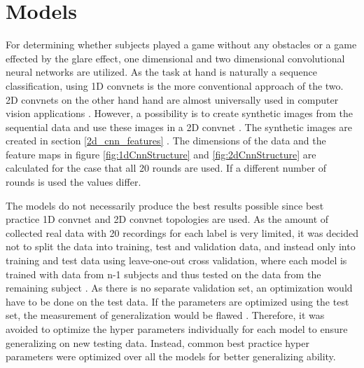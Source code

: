 \section{Models}
\label{models}
For determining whether subjects played a game without any obstacles or a game effected by the glare effect, one dimensional and two dimensional convolutional neural networks are utilized. As the task at hand is naturally a sequence classification, using 1D convnets is the more conventional approach of the two. 2D convnets on the other hand hand are almost universally used in computer vision applications \cite[Chapter~5]{cnn}. However, a possibility is to create synthetic images from the sequential data and use these images in a 2D convnet \cite{2dcnn}. The synthetic images are created in section \ref{2d_cnn_features} . The dimensions of the data and the feature maps in figure \ref{fig:1dCnnStructure} and \ref{fig:2dCnnStructure} are calculated for the case that all 20 rounds are used. If a different number of rounds is used the values differ. 

The models do not necessarily produce the best results possible since best practice 1D convnet \cite{1dcnn} and 2D convnet \cite{2dcnn} topologies are used. As the amount of collected real data with 20 recordings for each label is very limited, it was decided not to split the data into training, test and validation data, and instead only into training and test data using leave-one-out cross validation, where each model is trained with data from n-1 subjects and thus tested on the data from the remaining subject \cite[Chapter~1]{oneOut}. As there is no separate validation set, an optimization would have to be done on the test data. If the parameters are optimized using the test set, the measurement of generalization would be flawed \cite[Chaper~4]{cnn}. Therefore, it was avoided to optimize the hyper parameters individually for each model to ensure generalizing on new testing data. Instead, common best practice hyper parameters were optimized over all the models for better generalizing ability.



